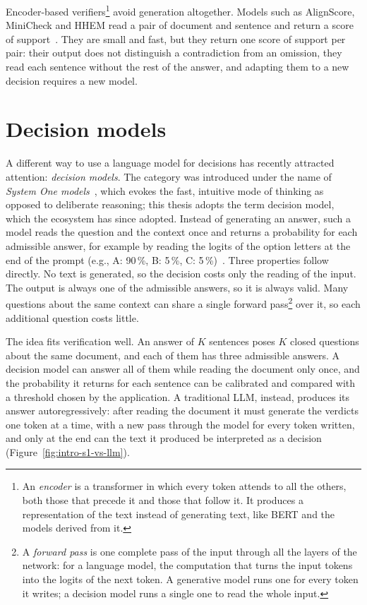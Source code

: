Encoder-based verifiers\footnote{An \emph{encoder} is a transformer in which every token attends to all the others,
both those that precede it and those that follow it. It produces a representation of the text instead of generating
text, like BERT and the models derived from it.} avoid generation altogether. Models such as AlignScore, MiniCheck and HHEM read a pair of document
and sentence and return a score of support~\cite{zha2023alignscore,tang2024minicheck,vectara2024hhem}. They are small and fast, but they return one score of support per pair: their output does not distinguish a contradiction from an omission, they read
each sentence without the rest of the answer, and adapting them to a new decision requires a new model.

\section{Decision models}
\label{sec:intro-systemone}

A different way to use a language model for decisions has recently attracted attention: \emph{decision models}. The
category was introduced under the name of \emph{System One models}~\cite{typesafe2026jev}, which evokes the fast,
intuitive mode of thinking as opposed to deliberate reasoning; this thesis adopts the term decision model, which the ecosystem has since adopted. Instead of generating an answer, such a model reads the question and the context once and returns a
probability for each admissible answer, for example by reading the logits of the option letters at the end of the
prompt (e.g., A: 90\,\%, B: 5\,\%, C: 5\,\%)~\cite{semif,rizzoflow}. Three properties follow directly. No text is generated, so the decision costs only the
reading of the input. The output is always one of the admissible answers, so it is always valid. Many questions about the
same context can share a single forward pass\footnote{A \emph{forward pass} is one complete pass of the input through
all the layers of the network: for a language model, the computation that turns the input tokens into the logits of the
next token. A generative model runs one for every token it writes; a decision model runs a single one to read the whole
input.} over it, so each additional question costs little.

The idea fits verification well. An answer of $K$ sentences poses $K$ closed questions about the same document, and each
of them has three admissible answers. A decision model can answer all of them while reading the document only once, and the
probability it returns for each sentence can be calibrated and compared with a threshold chosen by the application.
A traditional LLM, instead, produces its answer autoregressively: after reading the document it must generate the
verdicts one token at a time, with a new pass through the model for every token written, and only at the end can the
text it produced be interpreted as a decision (Figure~\ref{fig:intro-s1-vs-llm}).

